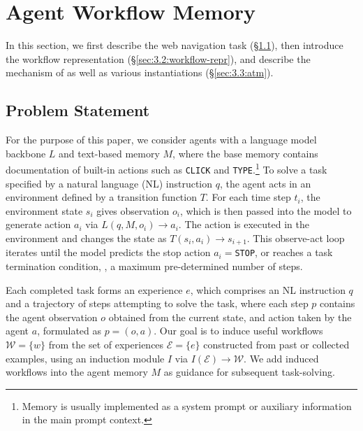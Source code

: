 \vspace{-1mm}
\section{Agent Workflow Memory}
\label{sec:3:method}

In this section, we first describe the web navigation task (\S\ref{sec:3.1:problem-statement}), then introduce the workflow representation (\S\ref{sec:3.2:workflow-repr}), and describe the mechanism of \awm as well as various instantiations (\S\ref{sec:3.3:atm}).

\subsection{Problem Statement}
\label{sec:3.1:problem-statement}

For the purpose of this paper, we consider agents with a language model backbone $L$ and text-based memory $M$, where the base memory contains documentation of built-in actions such as \texttt{CLICK} and \texttt{TYPE}.\footnote{Memory is usually implemented as a system prompt or auxiliary information in the main prompt context.} To solve a task specified by a natural language (NL) instruction $q$, the agent acts in an environment defined by a transition function $T$. 
For each time step $t_i$, the environment state $s_i$ gives observation $o_i$, which is then passed into the model to generate action $a_i$ via $L(q, M, o_i) \rightarrow a_i$. The action is executed in the environment and changes the state as $T(s_i, a_i) \rightarrow s_{i+1}$. This observe-act loop iterates until the model predicts the stop action $a_i = $\verb|STOP|, or reaches a task termination condition, \eg, a maximum pre-determined number of steps.


Each completed task forms an experience $e$, which comprises an NL instruction $q$ and a trajectory of steps attempting to solve the task, where each step $p$ contains the agent observation $o$ obtained from the current state, and action taken by the agent $a$, formulated as $p = (o, a)$. 
Our goal is to induce useful workflows $\mathcal{W}=\{w\}$ from the set of experiences $\mathcal{E}=\{e\}$ constructed from past or collected examples, using an induction module $I$ via $I(\mathcal{E}) \rightarrow \mathcal{W}$. We add induced workflows into the agent memory $M$ as guidance for subsequent task-solving. 

